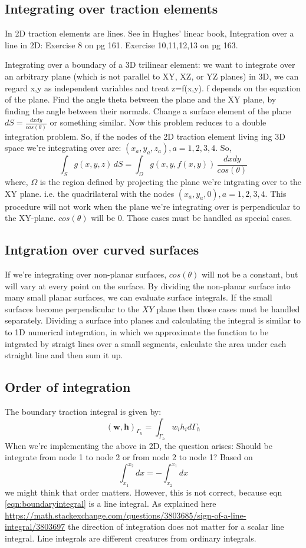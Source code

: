 \documentclass{article}
\newcommand{\beq}{\begin{equation}}
\newcommand{\eeq}{\end{equation}}
\begin{document}
\subsection{Integrating over traction elements}
In 2D traction elements are lines. See in Hughes' linear book, Integration over a line in 2D: Exercise 8 on pg 161. Exercise 10,11,12,13 on pg 163.

Integrating over a boundary of a 3D trilinear element: we want to integrate over an arbitrary plane (which is not parallel to XY, XZ, or YZ planes) in 3D, we can regard x,y as independent variables and treat z=f(x,y). f depends on the equation of the plane.  Find the angle theta between the plane and the XY plane, by finding the angle between their normals. Change a surface element of the plane $dS=\frac{dxdy}{cos(\theta)}$ or something similar. Now this problem reduces to a double integration problem. So, if the nodes of the 2D traction element living ing 3D space we're integrating over are: $(x_a,y_a,z_a), a=1,2,3,4$. So,
\beq
\int_{S}g(x,y,z)\,dS = \int_{\Omega} g(x,y,f(x,y))\,\frac{dxdy}{cos(\theta)}
\eeq
where, $\Omega$ is the region defined by projecting the plane we're intgrating over to the XY plane. i.e. the quadrilateral with the nodes $(x_a,y_a,0), a=1,2,3,4$. This procedure will not work when the plane we're integrating over is perpendicular to the XY-plane. $cos(\theta)$ will be $0$. Those cases must be handled as special cases.
\subsection{Intgration over curved surfaces}
If we're integrating over non-planar surfaces, $cos(\theta)$ will not be a constant, but will vary at every point on the surface. By dividing the non-planar surface into many small planar surfaces, we can evaluate surface integrals. If the small surfaces become perpendicular to the $XY$ plane then those cases must be handled separately. Dividing a surface into planes and calculating the integral is similar to to 1D numerical integration, in which we approximate the function to be intgrated by straigt lines over a small segments, calculate the area under each straight line and then sum it up.
\subsection{Order of integration}
The boundary traction integral is given by:
\beq
\label{eqn:boundaryintegral}
(\mathbf{w},\mathbf{h})_{\Gamma_h} = \int_{\Gamma_h}w_ih_i d\Gamma_h
\eeq
When we're implementing the above in 2D, the question arises: Should be integrate from node 1 to node 2 or from node 2 to node 1?
Based on
\beq
\int_{x_1}^{x_2} dx = -\int_{x_2}^{x_1} dx
\eeq
we might think that order matters. However, this is not correct, because eqn \ref{eqn:boundaryintegral} is a line integral. As explained here \url{https://math.stackexchange.com/questions/3803685/sign-of-a-line-integral/3803697} the direction of integration does not matter for a scalar line integral. Line integrals are different creatures from ordinary integrals.
\end{document}
